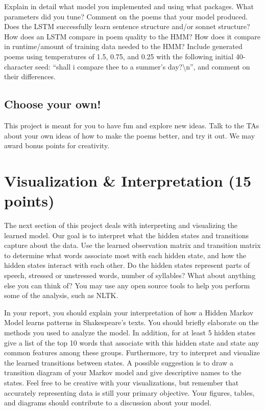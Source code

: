Explain in detail what model you implemented and using what packages. What parameters did you tune? Comment on the poems that your model produced. Does the LSTM successfully learn sentence structure and/or sonnet structure? How does an LSTM compare in poem quality to the HMM? How does it compare in runtime/amount of training data needed to the HMM? Include generated poems using temperatures of 1.5, 0.75, and 0.25 with the following initial 40-character seed: ``shall i compare thee to a summer's day?\textbackslash n'', and comment on their differences.

\subsection{Choose your own!}
This project is meant for you to have fun and explore new ideas. Talk to the TAs about your own ideas of how to make the poems better, and try it out. We may award bonus points for creativity.

\section{Visualization \& Interpretation (15 points)}
The next section of this project deals with interpreting and visualizing the learned model. Our goal is to interpret what the hidden states and transitions capture about the data. Use the learned observation matrix and transition matrix to determine what words associate most with each hidden state, and how the hidden states interact with each other. Do the hidden states represent parts of speech, stressed or unstressed words, number of syllables? What about anything else you can think of? You may use any open source tools to help you perform some of the analysis, such as NLTK.

In your report, you should explain your interpretation of how a Hidden Markov Model learns patterns in Shakespeare's texts. You should briefly elaborate on the methods you used to analyze the model. In addition, for at least 5 hidden states give a list of the top 10 words that associate with this hidden state and state any common features among these groups. Furthermore, try to interpret and visualize the learned transitions between states. A possible suggestion is to draw a transition diagram of your Markov model and give descriptive names to the states. Feel free to be creative with your visualizations, but remember that accurately representing data is still your primary objective. Your figures, tables, and diagrams should contribute to a discussion about your model.

